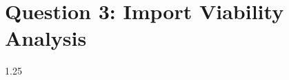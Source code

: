 \section{Question 3: Import Viability Analysis}
\label{sec:chap_3}

\begin{spacing}{1.25}


    
\end{spacing}